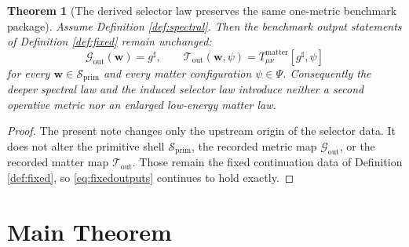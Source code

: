 \documentclass[11pt]{article}
\newcommand{\CompletedMetric}{g^{\sharp}}
\newcommand{\PrimShell}{\mathcal S_{\mathrm{prim}}}
\newcommand{\MetricOut}{\mathscr G_{\mathrm{out}}}
\newcommand{\MatterOut}{\mathscr T_{\mathrm{out}}}
\newtheorem{theorem}{Theorem}
\begin{document}
\begin{theorem}[The derived selector law preserves the same one-metric benchmark package]
\label{thm:outputs}
Assume Definition \ref{def:spectral}. Then the benchmark output statements of Definition \ref{def:fixed} remain unchanged:
\[
\MetricOut(\mathbf w)=\CompletedMetric,
\qquad
\MatterOut(\mathbf w,\psi)
=
T_{\mu\nu}^{\mathrm{matter}}[\CompletedMetric,\psi]
\]
for every \(\mathbf w\in\PrimShell\) and every matter configuration \(\psi\in\Psi\). Consequently the deeper spectral law and the induced selector law introduce neither a second operative metric nor an enlarged low-energy matter law.
\end{theorem}

\begin{proof}
The present note changes only the upstream origin of the selector data. It does not alter the primitive shell \(\PrimShell\), the recorded metric map \(\MetricOut\), or the recorded matter map \(\MatterOut\). Those remain the fixed continuation data of Definition \ref{def:fixed}, so \eqref{eq:fixedoutputs} continues to hold exactly.
\end{proof}

\section{Main Theorem}
\end{document}
